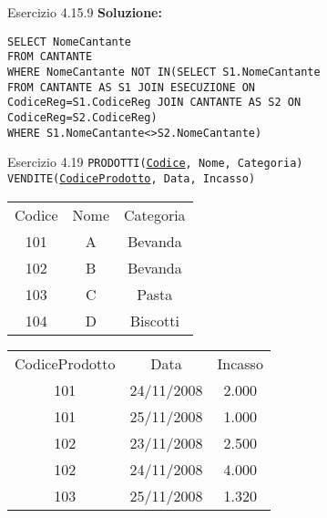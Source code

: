 \begin{frame}{Esercizio 4.15.9}
    \textbf{Soluzione:}
    \vspace{1em}
    
    \texttt{SELECT NomeCantante\\FROM CANTANTE\\WHERE NomeCantante NOT IN(SELECT S1.NomeCantante\\\hspace{13em}FROM CANTANTE AS S1 JOIN ESECUZIONE ON\\\hspace{12,5em} CodiceReg=S1.CodiceReg JOIN CANTANTE AS S2 ON\\\hspace{12,5em} CodiceReg=S2.CodiceReg)\\\hspace{13em}WHERE S1.NomeCantante<>S2.NomeCantante)}
    \end{frame}
\begin{frame}{Esercizio 4.19}
    \texttt{PRODOTTI(\underline{Codice}, Nome, Categoria)\\
    VENDITE(\underline{CodiceProdotto}, Data, Incasso)}
    \vspace{1em}
    \begin{table}[h]
\centering
\begin{minipage}{.45\textwidth}
\centering
\begin{tabular}{|c|c|c|}
\hline
\rowcolor{cyan!30} \multicolumn{3}{|c|}{Prodotti} \\
\hline
\rowcolor{cyan!30} Codice  & Nome & Categoria \\
\hline
101 & A & Bevanda \\
102 & B & Bevanda \\
103 & C & Pasta \\
104 & D & Biscotti \\
\hline
\end{tabular}
\end{minipage}%
\begin{minipage}{.45\textwidth}
\centering
\begin{tabular}{|c|c|c|}
\hline
\rowcolor{cyan!30} \multicolumn{3}{|c|}{Vendite} \\
\hline
\rowcolor{cyan!30} CodiceProdotto  & Data & Incasso\\
\hline
101 & 24/11/2008 & 2.000 \\
101 & 25/11/2008 & 1.000 \\
102 & 23/11/2008 & 2.500 \\
102 & 24/11/2008 & 4.000 \\
103 & 25/11/2008 & 1.320 \\
\hline
\end{tabular}
\end{minipage}
\end{table}
\end{frame}


